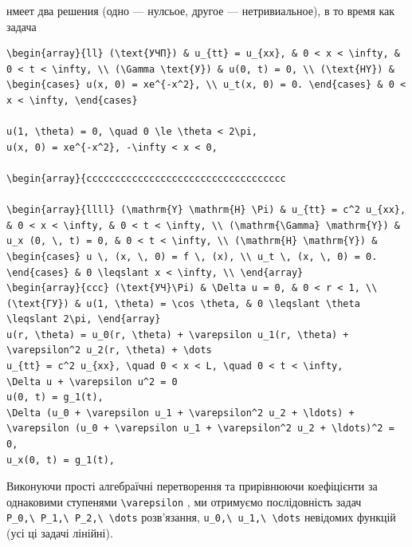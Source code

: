 \documentclass[
  ukrainian,
]{article}
\begin{document}
нмеет два решения (одно --- нулсьое, другое --- нетривиальное), в то
время как задача

\begin{verbatim}
\begin{array}{ll} (\text{УЧП}) & u_{tt} = u_{xx}, & 0 < x < \infty, & 0 < t < \infty, \\ (\Gamma \text{У}) & u(0, t) = 0, \\ (\text{HY}) & \begin{cases} u(x, 0) = xe^{-x^2}, \\ u_t(x, 0) = 0. \end{cases} & 0 < x < \infty, \end{cases}

u(1, \theta) = 0, \quad 0 \le \theta < 2\pi,
u(x, 0) = xe^{-x^2}, -\infty < x < 0,

\begin{array}{ccccccccccccccccccccccccccccccccccc

\begin{array}{llll} (\mathrm{Y} \mathrm{H} \Pi) & u_{tt} = c^2 u_{xx}, & 0 < x < \infty, & 0 < t < \infty, \\ (\mathrm{\Gamma} \mathrm{Y}) & u_x (0, \, t) = 0, & 0 < t < \infty, \\ (\mathrm{H} \mathrm{Y}) & \begin{cases} u \, (x, \, 0) = f \, (x), \\ u_t \, (x, \, 0) = 0. \end{cases} & 0 \leqslant x < \infty, \\ \end{array}
\begin{array}{ccc} (\text{УЧ}\Pi) & \Delta u = 0, & 0 < r < 1, \\ (\text{ГУ}) & u(1, \theta) = \cos \theta, & 0 \leqslant \theta \leqslant 2\pi, \end{array}
u(r, \theta) = u_0(r, \theta) + \varepsilon u_1(r, \theta) + \varepsilon^2 u_2(r, \theta) + \dots
u_{tt} = c^2 u_{xx}, \quad 0 < x < L, \quad 0 < t < \infty,
\Delta u + \varepsilon u^2 = 0
u(0, t) = g_1(t),
\Delta (u_0 + \varepsilon u_1 + \varepsilon^2 u_2 + \ldots) + \varepsilon (u_0 + \varepsilon u_1 + \varepsilon^2 u_2 + \ldots)^2 = 0,
u_x(0, t) = g_1(t),
\end{verbatim}

Виконуючи прості алгебраїчні перетворення та прирівнюючи коефіцієнти за
однаковими ступенями \texttt{\textbackslash{}varepsilon} , ми отримуємо
послідовність задач
\texttt{P\_0,\textbackslash{}\ P\_1,\textbackslash{}\ P\_2,\textbackslash{}\ \textbackslash{}dots}
розв'язання,
\texttt{u\_0,\textbackslash{}\ u\_1,\textbackslash{}\ \textbackslash{}dots}
невідомих функцій (усі ці задачі лінійні).
\end{document}
